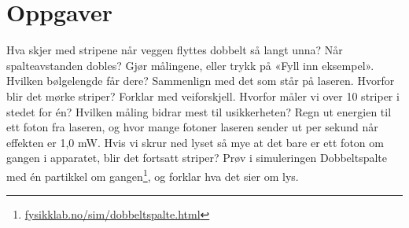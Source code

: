 \documentclass[11pt]{article}
\begin{document}
\section*{Oppgaver}

\begin{oppgaveliste}
\oppgave {}Hva skjer med stripene når veggen flyttes dobbelt så langt unna? Når spalteavstanden dobles?
\svar
\oppgave {}Gjør målingene, eller trykk på «Fyll inn eksempel». Hvilken bølgelengde får dere? Sammenlign med det som står på laseren.
\svar
\oppgave {}Hvorfor blir det mørke striper? Forklar med veiforskjell.
\svar
\oppgave {}Hvorfor måler vi over 10 striper i stedet for én? Hvilken måling bidrar mest til usikkerheten?
\svar
\oppgave {}Regn ut energien til ett foton fra laseren, og hvor mange fotoner laseren sender ut per sekund når effekten er 1,0 mW.
\svar
\oppgave {}Hvis vi skrur ned lyset så mye at det bare er ett foton om gangen i apparatet, blir det fortsatt striper? Prøv i simuleringen Dobbeltspalte med én partikkel om gangen\footnote{\url{fysikklab.no/sim/dobbeltspalte.html}}, og forklar hva det sier om lys.
\svar
\end{oppgaveliste}
\end{document}
